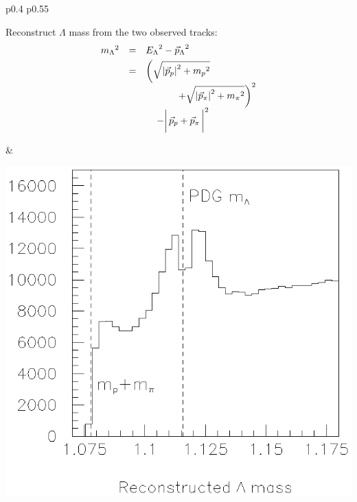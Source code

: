 \begin{slide*}
\begin{minipage}[t]{\linewidth}
\begin{center}
  \vspace{-0.1 cm} \begin{tabular}{p{0.4\linewidth} p{0.55\linewidth}}
    \begin{minipage}{\linewidth}
      Reconstruct $\Lambda$ mass from the two observed tracks: \\
      \[ \begin{array}{r c l}
           \mbox{$m_\Lambda$}^2 &=& \mbox{$E_\Lambda$}^2 - \mbox{$\vec{p}_\Lambda$}^2 \\
	   \vspace{-0.3 cm} & & \\
	                        &=& \bigg(\sqrt{\left|\mbox{$\vec{p}_p$}\right|^2 + \mbox{$m_p$}^2} \\
                                & & \hspace{1.2 cm} + \sqrt{\left|\mbox{$\vec{p}_\pi$}\right|^2 + \mbox{$m_\pi$}^2}\bigg)^2 \\
				& & \hspace{0.4 cm} - \bigg| \, \vec{p}_p + \vec{p}_\pi \, \bigg|^2 \\
         \end{array} \]
    \end{minipage} &
    \begin{minipage}{\linewidth}
      \includegraphics[width=\linewidth]{lambdamass.eps}
    \end{minipage}
  \end{tabular}
\end{center}


\end{minipage}
\end{slide*}

